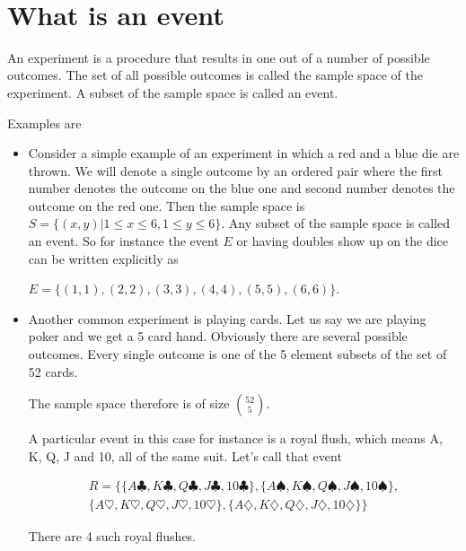 \documentclass[12pt]{article}
\begin{document}
\begin{center}
\\
\vspace{1cm}
\end{center}


\medskip\noindent


\vspace{0.5cm}\noindent

\section*{What is an event}

An experiment is a procedure that results in one out of a number of possible outcomes. The set of all possible outcomes is called the sample space of the experiment. A subset of the sample space is called an event.

Examples are 

\begin{itemize}
\item Consider a simple example of an experiment in which a red and a blue die are thrown. We will denote a single outcome by an ordered pair where the first number denotes the outcome on the blue one and second number denotes the outcome on the red one.
Then the sample space is $S = \{(x,y)| 1 \le x \le 6, 1 \le y \le 6\}$.
Any subset of the sample space is called an event. So for instance the event $E$ or having doubles show up on the dice can be written explicitly as

$E = \{(1,1), (2,2), (3,3), (4,4), (5,5), (6,6)\}$.

\item Another common experiment is playing cards. Let us say we are playing poker and we get a 5 card hand. Obviously there are several possible outcomes. Every single outcome is one of the 5 element subsets of the set of 52 cards. 

The sample space therefore is of size ${52 \choose 5}$.

A particular event in this case for instance is a royal flush, which means A, K, Q, J and 10, all of the same suit. Let's call that event 

\begin{multline*}
R = \{\{A \clubsuit, K \clubsuit, Q \clubsuit, J \clubsuit, 10 \clubsuit\} , \{A \spadesuit, K \spadesuit, Q \spadesuit, J \spadesuit, 10 \spadesuit \}, \\
\{A \heartsuit, K \heartsuit, Q \heartsuit, J \heartsuit, 10 \heartsuit \} , \{ A \diamondsuit, K \diamondsuit, Q \diamondsuit, J \diamondsuit , 10 \diamondsuit \} \}
\end{multline*} 

There are 4 such royal flushes. 

\end{itemize}
\end{document}
